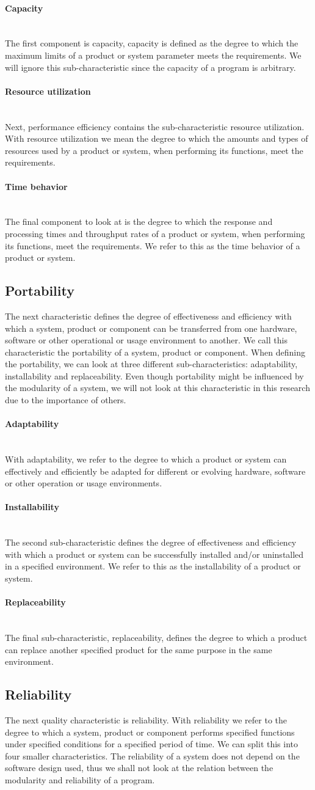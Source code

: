 \documentclass[twoside]{uva-inf-bachelor-thesis}
\newcommand{\myparagraph}[1]{\paragraph{#1}\mbox{}\\}
\begin{document}
\myparagraph{Capacity}
The first component is capacity, capacity is defined as the degree to which the maximum limits of a product or system parameter meets the requirements. We will ignore this sub-characteristic since the capacity of a program is arbitrary.

\myparagraph{Resource utilization}
Next, performance efficiency contains the sub-characteristic resource utilization. With resource utilization we mean the degree to which the amounts and types of resources used by a product or system, when performing its functions, meet the requirements.

\myparagraph{Time behavior}
The final component to look at is the degree to which the response and processing times and throughput rates of a product or system, when performing its functions, meet the requirements. We refer to this as the time behavior of a product or system.

\subsection{Portability}
The next characteristic defines the degree of effectiveness and efficiency with which a system, product or component can be transferred from one hardware, software or other operational or usage environment to another. We call this characteristic the portability of a system, product or component. When defining the portability, we can look at three different sub-characteristics: adaptability, installability and replaceability. Even though portability might be influenced by the modularity of a system, we will not look at this characteristic in this research due to the importance of others.

\myparagraph{Adaptability}
With adaptability, we refer to the degree to which a product or system can effectively and efficiently be adapted for different or evolving hardware, software or other operation or usage environments.

\myparagraph{Installability}
The second sub-characteristic defines the degree of effectiveness and efficiency with which a product or system can be successfully installed and/or uninstalled in a specified environment. We refer to this as the installability of a product or system.

\myparagraph{Replaceability}
The final sub-characteristic, replaceability, defines the degree to which a product can replace another specified product for the same purpose in the same environment.

\subsection{Reliability}
The next quality characteristic is reliability. With reliability we refer to the degree to which a system, product or component performs specified functions under specified conditions for a specified period of time. We can split this into four smaller characteristics. The reliability of a system does not depend on the software design used, thus we shall not look at the relation between the modularity and reliability of a program.
\end{document}
